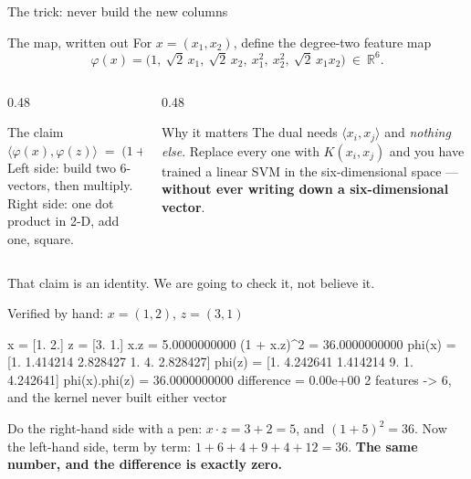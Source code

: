 \documentclass[aspectratio=169]{beamer}
\begin{document}
\begin{frame}[shrink=6]{The trick: never build the new columns}
  \begin{block}{The map, written out}
    For $x = (x_1,x_2)$, define the degree-two feature map
    \[
      \varphi(x) = \bigl(1,\ \sqrt2\,x_1,\ \sqrt2\,x_2,\
                      x_1^2,\ x_2^2,\ \sqrt2\,x_1x_2\bigr)
      \ \in\ \mathbb{R}^6 .
    \]
  \end{block}
  \begin{columns}[T]
    \begin{column}{0.48\textwidth}
      \begin{exampleblock}{The claim}
        \[
          \langle \varphi(x), \varphi(z)\rangle
          \;=\; \bigl(1 + \langle x, z\rangle\bigr)^2 .
        \]
        Left side: build two 6-vectors, then multiply. Right side: one dot
        product in 2-D, add one, square.
      \end{exampleblock}
    \end{column}
    \begin{column}{0.48\textwidth}
      \begin{alertblock}{Why it matters}
        The dual needs $\langle x_i, x_j\rangle$ and \emph{nothing else}.
        Replace every one with $K(x_i,x_j)$ and you have trained a linear
        SVM in the six-dimensional space --- \textbf{without ever writing
        down a six-dimensional vector}.
      \end{alertblock}
    \end{column}
  \end{columns}
  \begin{center}\small
    That claim is an identity. We are going to check it, not believe it.
  \end{center}
\end{frame}

\begin{frame}[fragile,shrink=6]{Verified by hand: $x = (1,2)$, $z = (3,1)$}
\begin{outblk}
x = [1. 2.]   z = [3. 1.]
x.z            = 5.0000000000
(1 + x.z)^2    = 36.0000000000
phi(x) = [1.       1.414214 2.828427 1.       4.       2.828427]
phi(z) = [1.       4.242641 1.414214 9.       1.       4.242641]
phi(x).phi(z)  = 36.0000000000
difference     = 0.00e+00
2 features -> 6, and the kernel never built either vector
\end{outblk}
  \begin{center}\small
    Do the right-hand side with a pen: $x\cdot z = 3 + 2 = 5$, and
    $(1+5)^2 = 36$. Now the left-hand side, term by term:
    $1 + 6 + 4 + 9 + 4 + 12 = 36$. \textbf{The same number, and the
    difference is exactly zero.}
  \end{center}
\end{frame}
\end{document}
